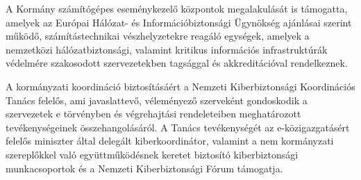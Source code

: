 A Kormány számítógépes eseménykezelő központok megalakulását is támogatta, amelyek az Európai Hálózat- és Információbiztonsági Ügynökség ajánlásai szerint működő, számítástechnikai vészhelyzetekre reagáló egységek, amelyek a nemzetközi hálózatbiztonsági, valamint kritikus információs infrastruktúrák védelmére szakosodott szervezetekben tagsággal és akkreditációval rendelkeznek.

A kormányzati koordináció biztosításáért a Nemzeti Kiberbiztonsági Koordinációs Tanács felelős, ami javaslattevő, véleményező szerveként gondoskodik a szervezetek e törvényben és végrehajtási rendeleteiben meghatározott tevékenységeinek összehangolásáról. A Tanács tevékenységét az e-közigazgatásért felelős miniszter által delegált kiberkoordinátor, valamint a nem kormányzati szereplőkkel való együttműködésnek keretet biztosító kiberbiztonsági munkacsoportok és a Nemzeti Kiberbiztonsági Fórum támogatja.